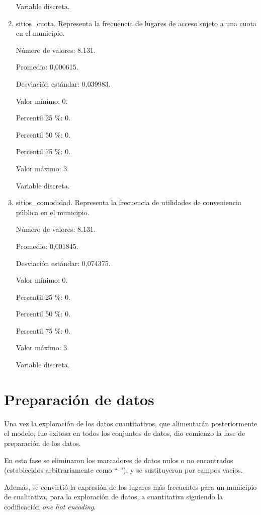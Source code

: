 \begin{enumerate}
	Variable discreta.

	\item sitios\_cuota. Representa la frecuencia de lugares de acceso sujeto a una cuota en el municipio.
	
	Número de valores: 8.131.
	
	Promedio: 0,000615.
	
	Desviación estándar: 0,039983.
	
	Valor mínimo: 0.
	
	Percentil 25 \%: 0.
	
	Percentil 50 \%: 0.
	
	Percentil 75 \%: 0.
	
	Valor máximo: 3.
	
	Variable discreta.

	\item sitios\_comodidad. Representa la frecuencia de utilidades de conveniencia pública en el municipio.
	
	Número de valores: 8.131.
	
	Promedio: 0,001845.
	
	Desviación estándar: 0,074375.
	
	Valor mínimo: 0.
	
	Percentil 25 \%: 0.
	
	Percentil 50 \%: 0.
	
	Percentil 75 \%: 0.
	
	Valor máximo: 3.
	
	Variable discreta.
\end{enumerate}

\section{Preparación de datos}

Una vez la exploración de los datos cuantitativos, que alimentarán posteriormente el modelo, fue exitosa en todos los conjuntos de datos, dio comienzo la fase de preparación de los datos.

En esta fase se eliminaron los marcadores de datos nulos o no encontrados (establecidos arbitrariamente como ``-''), y se sustituyeron por campos vacíos.


Además, se convirtió la expresión de los lugares más frecuentes para un municipio de cualitativa, para la exploración de datos, a cuantitativa siguiendo la codificación \textit{one hot encoding}.

